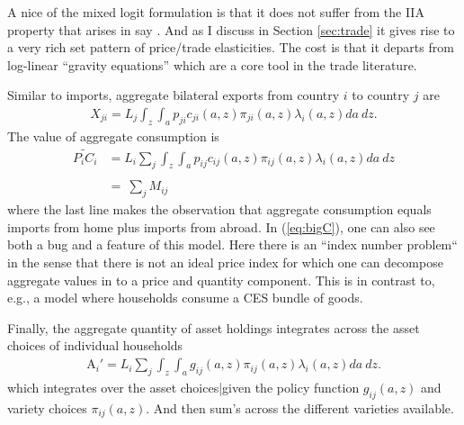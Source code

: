 \documentclass[12pt,pdftex]{article}
\begin{document}
\begin{onehalfspacing}
A nice of the mixed logit formulation is that it does not suffer from the IIA property that arises in say \citet{eaton2002technology}. And as I discuss in Section \ref{sec:trade} it gives rise to a very rich set pattern of price/trade elasticities. The cost is that it departs from log-linear ``gravity equations'' which are a core tool in the trade literature.

Similar to imports, aggregate bilateral exports from country $i$ to country $j$ are
\begin{align}
X_{ji} = L_j \int_{z} \int_{a}  p_{ji} c_{ji}(a, z) \pi_{ji}(a, z) \lambda_i(a, z)da \ dz.
\label{eq:exports}
\end{align}
The value of aggregate consumption is
\begin{align}
\widetilde{P_{i} C_i}  &=  L_{i} \sum_{j} \int_{z} \int_{a}  p_{ij} c_{ij}(a, z) \pi_{ij}(a, z) \lambda_i(a, z)da \ dz \label{eq:bigC}\\
\nonumber \\
&= \ \sum_{j} M_{ij}
\end{align}
where the last line makes the observation that aggregate consumption equals imports from home plus imports from abroad. In (\ref{eq:bigC}), one can also see both a bug and a feature of this model. Here there is an ``index number problem`` in the sense that there is not an ideal price index for which one can decompose aggregate values in to a price and quantity component. This is in contrast to, e.g., a model where households consume a CES bundle of goods.

Finally, the aggregate quantity of asset holdings integrates across the asset choices of individual households
\begin{align}
\mathrm{A}_i' = L_{i}\sum_{j} \int_{z} \int_{a}  g_{ij}(a, z) \pi_{ij}(a, z) \lambda_i(a, z) da \ dz.
\label{eq:aggregate_asset}
\end{align}
which integrates over the asset choices|given the policy function $g_{ij}(a, z)$ and variety choices $\pi_{ij}(a, z)$. And then sum's across the different varieties available.


\end{onehalfspacing}
\end{document}
